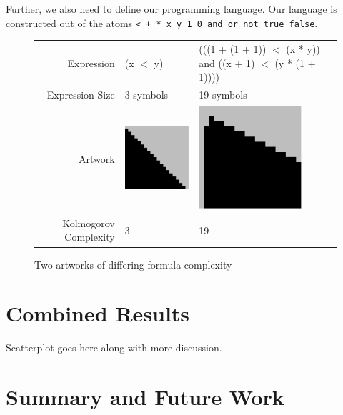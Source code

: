 \documentclass[11pt]{article}
\begin{document}
Further, we also need to define our programming language.  Our language is
constructed out of the atoms {\tt < + * x y 1 0 and or not true false}.


\begin{figure}
\begin{center}
\begin{tabular}{r | p{2in}   p{2in}}
Expression & (x $<$ y) &
(((1 + (1 + 1)) $<$  (x * y)) and 
          ((x + 1) $<$ (y * (1 + 1)))) \\
Expression Size & 3 symbols & 19 symbols\\
  Artwork & \includegraphics[width=1.5in]{../presentation/simple.png} &
  \includegraphics[width=1.5in]{../presentation/complex.png} \\
Kolmogorov Complexity& 3 &
19
\end{tabular}
\end{center}

\caption{Two artworks of differing formula complexity}
\end{figure}




\section{Combined Results}

Scatterplot goes here along with more discussion.

\section{Summary and Future Work}
\end{document}
